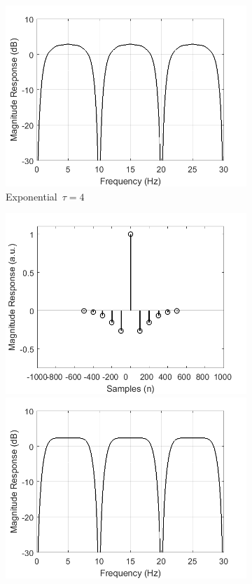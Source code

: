 \documentclass[a4paper]{article}
\begin{document}
\begin{figure}[hbtp]
\begin{subfigure}{.245\textwidth}
        \includegraphics[width=\textwidth]{img/sym/mag_exp.png}
        \caption{Exponential~$\tau=4$}\label{fig:ExponentialSymKernel}
    \end{subfigure}
    \begin{subfigure}{.245\textwidth}
        \includegraphics[width=\textwidth]{img/sym/kernel_gauss.png}\\
        \includegraphics[width=\textwidth]{img/sym/mag_gauss.png}

\end{subfigure}
\end{figure}
\end{document}
